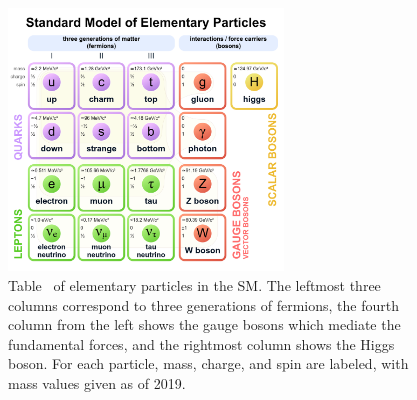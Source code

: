 \begin{figure}[htb]
	\begin{center}
	\includegraphics[width=0.65\textwidth]{fig/theory/Standard_Model_of_Elementary_Particles.png}
		\caption[Table of elementary particles in the SM. The leftmost three columns correspond to three generations of fermions, 
		the fourth column from the left shows the gauge bosons which mediate the elementary forces, and the rightmost column shows the Higgs boson. 
		For each particle, mass, charge, and spin are labeled, with mass values given as of 2019.]
		{Table~\cite{SMImage} of elementary particles in the SM. The leftmost three columns correspond to three generations of fermions, 
		the fourth column from the left shows the gauge bosons which mediate the fundamental forces, and the rightmost column shows the Higgs boson. 
		For each particle, mass, charge, and spin are labeled, with mass values given as of 2019.}
		\label{fig:SMParticles}
	\end{center}
\end{figure}


